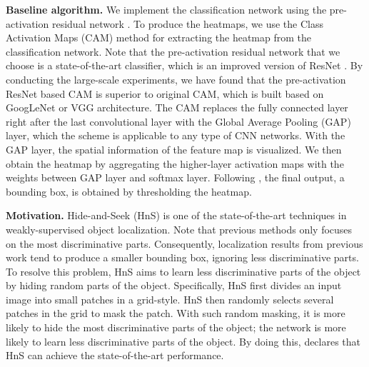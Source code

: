 \documentclass{bmvc2k}
\begin{document}
\textbf{Baseline algorithm.} We implement the classification network using the pre-activation residual network \cite{he2016identity}. To produce the heatmaps, we use the Class Activation Maps (CAM) method \cite{zhou2016learning} for extracting the heatmap from the classification network. Note that the pre-activation residual network that we choose is a state-of-the-art classifier, which is an improved version of ResNet \cite{he2016deep}. By conducting the large-scale experiments, we have found that the pre-activation ResNet based CAM is superior to original CAM, which is built based on GoogLeNet \cite{szegedy2015going} or VGG \cite{simonyan2014very} architecture. The CAM replaces the fully connected layer right after the last convolutional layer with the Global Average Pooling (GAP) layer, which the scheme is applicable to any type of CNN networks. With the GAP layer, the spatial information of the feature map is visualized. We then obtain the heatmap by aggregating the higher-layer activation maps with the weights between GAP layer and softmax layer. Following \cite{zhou2016learning}, the final output, a bounding box, is obtained by thresholding the heatmap. 

\textbf{Motivation.} Hide-and-Seek (HnS) \cite{singh2017hide} is one of the state-of-the-art techniques in weakly-supervised object localization. Note that previous methods only focuses on the most discriminative parts. Consequently, localization results from previous work tend to produce a smaller bounding box, ignoring less discriminative parts. To resolve this problem, HnS aims to learn less discriminative parts of the object by hiding random parts of the object. Specifically, HnS first divides an input image into small patches in a grid-style. HnS then randomly selects several patches in the grid to mask the patch. With such random masking, it is more likely to hide the most discriminative parts of the object; the network is more likely to learn less discriminative parts of the object. By doing this, \cite{singh2017hide} declares that HnS can achieve the state-of-the-art performance. 
\end{document}
